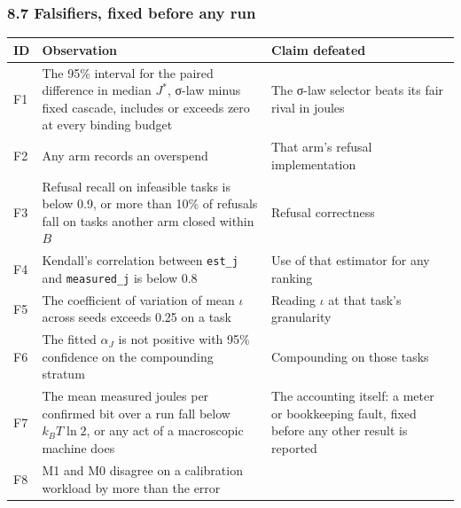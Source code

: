 \documentclass[
  10pt,
]{article}
\newcounter{none} %
\begin{document}
\subsubsection{8.7 Falsifiers, fixed before any
run}\label{falsifiers-fixed-before-any-run}

{\def\LTcaptype{none} %
\begin{longtable}[]{@{}
  >{\raggedright\arraybackslash}p{}
  >{\raggedright\arraybackslash}p{}
  >{\raggedright\arraybackslash}p{}@{}}
\toprule\noalign{}
\begin{minipage}[b]{\linewidth}\raggedright
ID
\end{minipage} & \begin{minipage}[b]{\linewidth}\raggedright
Observation
\end{minipage} & \begin{minipage}[b]{\linewidth}\raggedright
Claim defeated
\end{minipage} \\
\midrule\noalign{}
\endhead
\bottomrule\noalign{}
\endlastfoot
F1 & The 95\% interval for the paired difference in median \(J^*\),
σ-law minus fixed cascade, includes or exceeds zero at every binding
budget & The σ-law selector beats its fair rival in joules \\
F2 & Any arm records an overspend & That arm's refusal implementation \\
F3 & Refusal recall on infeasible tasks is below 0.9, or more than 10\%
of refusals fall on tasks another arm closed within \(B\) & Refusal
correctness \\
F4 & Kendall's correlation between \texttt{est\_j} and
\texttt{measured\_j} is below 0.8 & Use of that estimator for any
ranking \\
F5 & The coefficient of variation of mean \(\iota\) across seeds exceeds
0.25 on a task & Reading \(\iota\) at that task's granularity \\
F6 & The fitted \(\alpha_J\) is not positive with 95\% confidence on the
compounding stratum & Compounding on those tasks \\
F7 & The mean measured joules per confirmed bit over a run fall below
\(k_B T \ln 2\), or any act of a macroscopic machine does & The
accounting itself: a meter or bookkeeping fault, fixed before any other
result is reported \\
F8 & M1 and M0 disagree on a calibration workload by more than the error

\end{longtable}}
\end{document}

